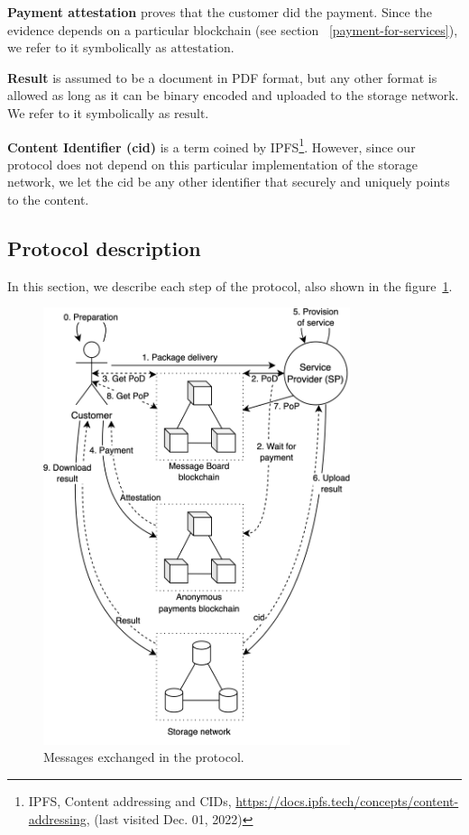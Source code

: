 \noindent \textbf
{Payment attestation}\label{payment-attestation} proves that the customer did the payment. Since the evidence depends on a particular blockchain (see section ~\ref{payment-for-services}), we refer to it symbolically as
\(\mathrm{attestation}\).

\noindent \textbf
{Result}\label{results} is assumed to be a document in PDF format, but any other format is allowed as long as it can be binary encoded and uploaded to the storage network. We refer to it symbolically as $\mathrm{result}$.

\noindent \textbf
{Content Identifier (cid)}\label{content-identifier-cid} is a term coined by IPFS\footnote{IPFS, Content addressing and CIDs, \url{https://docs.ipfs.tech/concepts/content-addressing}, (last visited Dec. 01, 2022)}. However, since our protocol does not depend on this particular implementation of the storage network, we let the $\mathrm{cid}$ be any other identifier that securely and uniquely points to the content.

\subsection{Protocol description}\label{protocol-description}

In this section, we describe each step of the protocol, also shown in the figure~\ref{fig:protocol-diagram}.

\begin{figure}[ht!]
\includegraphics[width=9cm]{anonser-protocol.png}
\centering
\caption{Messages exchanged in the protocol.}
\label{fig:protocol-diagram}
\end{figure}

